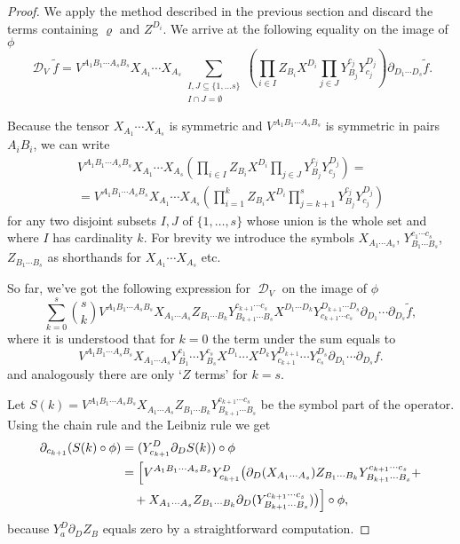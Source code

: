 \documentclass[final]{birkmult}
\theoremstyle{definition}
\theoremstyle{remark}
\numberwithin{equation}{section}
\newcommand{\p}[1]{\partial_{#1}}
\DeclareMathOperator{\aD}{\mathcal{D}}
\begin{document}
\begin{proof}
  We apply the method described in the previous section and discard the terms containing $\varrho$ and $Z^{D_i}$. We arrive at the following equality on the image of $\phi$
 \[\aD_V \tilde{f} = V^{A_1 B_1 \cdots  A_s B_s} X_{A_1} \cdots X_{A_s} \sum_{\substack{I,J \subseteq \{1,\ldots s\}\\ I\cap J=\emptyset}} \left(\prod_{i\in I}Z_{B_i}X^{D_i} \prod_{j \in J} Y_{B_j}^{c_j}Y_{c_j}^{D_j}\right) \p{D_1 \cdots D_s} \tilde{f}.\]

  Because the tensor $X_{A_1} \cdots X_{A_s}$ is symmetric and $V^{A_1 B_1 \cdots  A_s B_s}$ is symmetric in pairs $A_iB_i$, we can write
	\begin{multline*}
		V^{A_1 B_1 \cdots  A_s B_s} X_{A_1} \cdots X_{A_s} \left(\prod_{i\in I}Z_{B_i}X^{D_i} \prod_{j \in J} Y_{B_j}^{c_j}Y_{c_j}^{D_j}\right) = \\
		= V^{A_1 B_1 \cdots  A_s B_s} X_{A_1} \cdots X_{A_s} \left(\prod_{i=1}^kZ_{B_i}X^{D_i} \prod_{j =k+1}^s Y_{B_j}^{c_j}Y_{c_j}^{D_j}\right) 
	\end{multline*}
	for any two disjoint subsets $I,J$ of $\{1,\ldots,s\}$ whose union is the whole set and where $I$ has cardinality $k$. For brevity we introduce the symbols $X_{A_1\cdots A_s}$, $ Y_{B_1\cdots B_s}^{c_1\cdots c_s}$, $Z_{B_1\cdots B_s}$ as shorthands for $X_{A_1} \cdots X_{A_s}$ etc. 

 So far, we've got the following expression for $\aD_V$ on the image of $\phi$
	\[
	  \sum_{k=0}^s \binom{s}{k} V^{A_1 B_1 \cdots  A_s B_s} X_{A_1 \cdots A_s} Z_{B_1\cdots B_k}  Y_{B_{k+1}\cdots B_s}^{c_{k+1}\cdots c_s} X^{D_1\cdots D_k}Y_{c_{k+1}\cdots c_s}^{D_{k+1}\cdots D_s} \p{D_1} \cdots \p{D_s} \tilde{f},
	\]
	where it is understood that for $k=0$ the term under the sum equals to 
	\[
	V^{A_1 B_1 \cdots  A_s B_s} X_{A_1 \cdots A_s}  Y_{B_{1}}^{c_{1}}\cdots Y_{B_s}^{c_s}X^{D_1}\cdots{X^{D_k}}Y_{c_{k+1}}^{D_{k+1}}\cdots Y_{c_s}^{D_s} \p{D_1} \cdots \p{D_s} f.
	\] and analogously there are only `$Z$ terms' for $k=s$.

Let $S(k) = V^{A_1 B_1 \cdots  A_s B_s} X_{A_1 \cdots A_s} Z_{B_1\cdots B_k}  Y_{B_{k+1}\cdots B_s}^{c_{k+1}\cdots c_s}$ be the symbol part of the operator. Using the chain rule and the Leibniz rule we get
\begin{align*}
	\p{c_{k+1}}(S(k)\circ \phi) & = (Y_{c_{k+1}}^D\p{D}S(k))\circ \phi\\
	& = \Bigl[ V^{A_1 B_1 \cdots  A_s B_s} Y_{c_{k+1}}^D \bigl(\p{D}(X_{A_1 \cdots  A_s})  Z_{B_1\cdots B_k} Y_{B_{k+1}\cdots B_s}^{c_{k+1}\cdots c_s}+\\
      &\quad  + X_{A_1 \cdots  A_s}Z_{B_1\cdots B_k} \p{D}(  Y_{B_{k+1}\cdots B_s}^{c_{k+1}\cdots c_s})\bigr) \Bigr] \circ \phi,
\end{align*}
because $Y_a^D\p{D}Z_B$ equals zero by a straightforward computation.


\end{proof}
\end{document}
